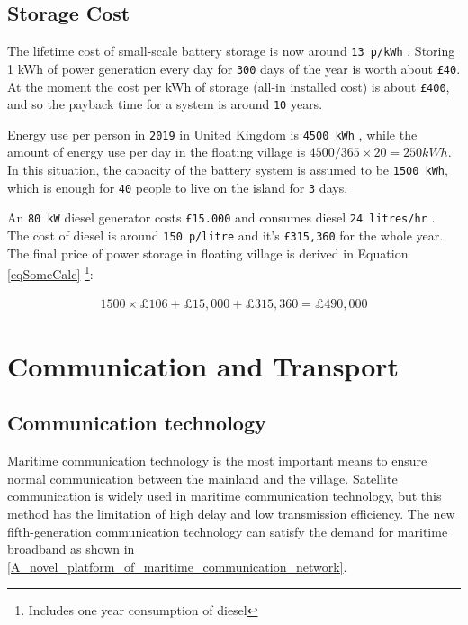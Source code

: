 \documentclass[11pt]{article}
\numberwithin{equation}{section}
\begin{document}
\subsection{Storage Cost}
\label{sec:orgc6e3d76}
The lifetime cost of small-scale battery storage is now around \texttt{13 p/kWh} \cite{1234}. Storing 1 kWh of power generation every day for \texttt{300} days of the year is worth about \texttt{£40}. At the moment the cost per kWh of storage (all-in installed cost) is about \texttt{£400}, and so the payback time for a system is around \texttt{10} years.

Energy use per person in \texttt{2019} in United Kingdom is \texttt{4500 kWh} \cite{12345}, while the amount of energy use per day in the floating village is \(4500/365 \times 20 = 250 kWh\). In this situation, the capacity of the battery system is assumed to be \texttt{1500 kWh}, which is enough for \texttt{40} people to live on the island for \texttt{3} days.

An \texttt{80 kW} diesel generator costs \texttt{£15.000} \cite{123abc} and consumes diesel \texttt{24 litres/hr} \cite{123bcd}. The cost of diesel is around \texttt{150 p/litre} \cite{123cde} and it’s \texttt{£315,360} for the whole year. The final price of power storage in floating village is derived in Equation \ref{eqSomeCalc} \footnote{Includes one year consumption of diesel}:

\begin{align}
\label{eqSomeCalc}
1500\times\pounds106 + \pounds15,000 + \pounds315,360 = \pounds 490,000
\end{align}

\section{Communication and Transport}
\label{sec:orga7ab480}
\subsection{Communication technology}
\label{sec:orga7bd287}
Maritime communication technology is the most important means to ensure normal communication between the mainland and the village.  Satellite communication is widely used in maritime communication technology, but this method has the limitation of high delay and low transmission efficiency. The new fifth-generation communication technology can satisfy the demand for maritime broadband as shown in \ref{A_novel_platform_of_maritime_communication_network}.
\end{document}
